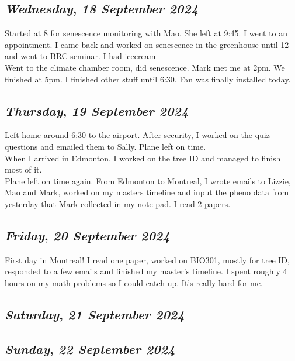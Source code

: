 \def\day{\textit{18 September 2024}}
\def\weekday{\textit{Wednesday}}
\subsection*{\weekday, \day}
Started at 8 for senescence monitoring with Mao. She left at 9:45. I went to an appointment. I came back and worked on senescence in the greenhouse until 12 and went to BRC seminar. I had icecream\\
Went to the climate chamber room, did senescence. Mark met me at 2pm. We finished at 5pm. I finished other stuff until 6:30. Fan was finally installed today. 

\def\day{\textit{19 September 2024}}
\def\weekday{\textit{Thursday}}
\subsection*{\weekday, \day}
Left home around 6:30 to the airport. After security, I worked on the quiz questions and emailed them to Sally. Plane left on time. \\
When I arrived in Edmonton, I worked on the tree ID and managed to finish most of it.\\
Plane left on time again. From Edmonton to Montreal, I wrote emails to Lizzie, Mao and Mark, worked on my masters timeline and input the pheno data from yesterday that Mark collected in my note pad. I read 2 papers. 

\def\day{\textit{20 September 2024}}
\def\weekday{\textit{Friday}}
\subsection*{\weekday, \day}
First day in Montreal! I read one paper, worked on BIO301, mostly for tree ID, responded to a few emails and finished my master's timeline. I spent roughly 4 hours on my math problems so I could catch up. It's really hard for me. 

\def\day{\textit{21 September 2024}}
\def\weekday{\textit{Saturday}}
\subsection*{\weekday, \day}

\def\day{\textit{22 September 2024}}
\def\weekday{\textit{Sunday}}
\subsection*{\weekday, \day}

